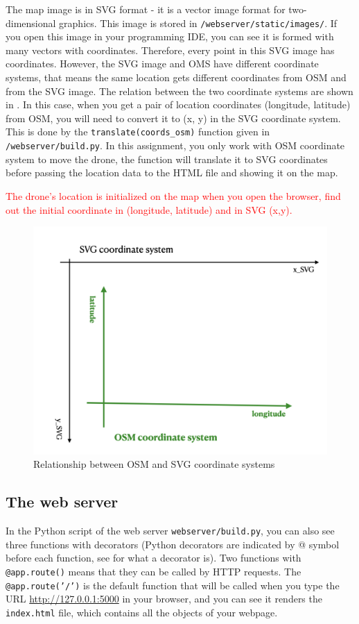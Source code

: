 \documentclass{article}
\begin{document}
The map image is in SVG format - it is a vector image format for two-dimensional graphics. This image is stored in \texttt{/webserver/static/images/}. If you open this image in your programming IDE, you can see it is formed with many vectors with coordinates. Therefore, every point in this SVG image has coordinates. However, the SVG image and OMS have different coordinate systems, that means the same location gets different coordinates from OSM and from the SVG image. The relation between the two coordinate systems are shown in .  In this case, when you get a pair of location coordinates (longitude, latitude) from OSM, you will need to convert it to (x, y) in the SVG coordinate system. This is done by the \texttt{translate(coords\_osm)} function given in \texttt{/webserver/build.py}. In this assignment, you only work with OSM coordinate system to move the drone, the function will translate it to SVG coordinates before passing the location data to the HTML file and showing it on the map.\\

\parbox[t]{14cm}{\textcolor{red}{The drone's location is initialized on the map when you open the browser, find out the initial coordinate in (longitude, latitude) and in SVG (x,y).}}


\begin{figure}[h!]
    \centering
    \includegraphics[width=120mm]{coords_sys.png}
    \caption{Relationship between OSM and SVG coordinate systems}
    \label{fig:OSMtoSVG}
\end{figure}

\subsection{The web server}
In the Python script of the web server \texttt{webserver/build.py}, you can also see three functions with decorators (Python decorators are indicated by @ symbol before each function, see \cite{deco} for what a decorator is). Two functions with \texttt{@app.route()} means that they can be called by HTTP requests. The \texttt{@app.route('/')} is the default function that will be called when you type the URL \url{http://127.0.0.1:5000} in your browser, and you can see it renders the \texttt{index.html} file, which contains all the objects of your webpage. 
\end{document}
